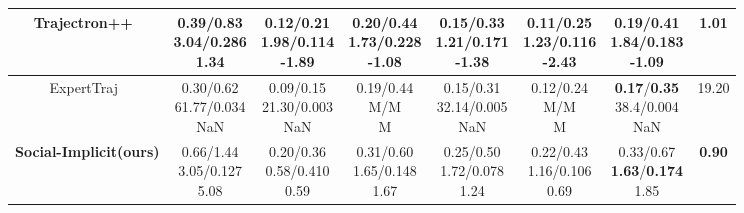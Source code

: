\documentclass[runningheads]{llncs}
\begin{document}
\begin{table}[!ht]
\begin{tabular}{c||c|c|c|c|c||c||c|}
\hline
Trajectron++~\cite{salzmann2020trajectron++}  & \makecell{0.39/0.83\\3.04/0.286\\1.34 }      &\makecell{ 0.12/0.21\\1.98/0.114\\-1.89}      &\makecell{ 0.20/0.44\\1.73/0.228\\-1.08}      &\makecell{ 0.15/0.33\\1.21/0.171\\-1.38}  &\makecell{ 0.11/0.25\\1.23/0.116\\-2.43}  &\makecell{ 0.19/0.41\\1.84/0.183\\\textbf{-1.09} }     & 1.01        \\ 
\hline
ExpertTraj~\cite{zhao2021you}    &\makecell{ 0.30/0.62\\61.77/0.034\\NaN}  &\makecell{ 0.09/0.15\\21.30/0.003\\NaN}   &\makecell{ 0.19/0.44\\M/M\\M}             &\makecell{ 0.15/0.31\\32.14/0.005\\NaN}    &\makecell{ 0.12/0.24\\M/M\\M}              &\makecell{ \textbf{0.17}/\textbf{0.35}\\38.4/0.004\\NaN}    & 19.20  \\ 
\midrule
\textbf{Social-Implicit(ours) }         &\makecell{ 0.66/1.44\\3.05/0.127\\5.08}  &\makecell{ 0.20/0.36\\0.58/0.410\\0.59}  &\makecell{ 0.31/0.60\\1.65/0.148\\1.67}  &\makecell{ 0.25/0.50\\1.72/0.078\\1.24}  &\makecell{ 0.22/0.43\\1.16/0.106\\0.69}   &\makecell{ 0.33/0.67\\\textbf{1.63}/\textbf{0.174}\\1.85} & \textbf{0.90}   \\
\hline
\end{tabular}
\end{table}
\end{document}

